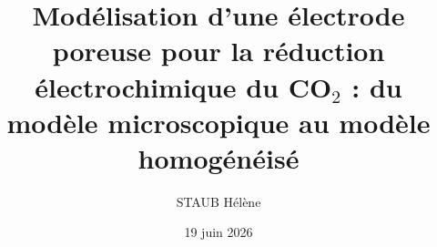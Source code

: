 \documentclass[12pt,a4paper,titlepage]{article}
\title{Modélisation d'une électrode poreuse pour la réduction électrochimique du CO$_2$ : du modèle microscopique au modèle homogénéisé}
\author{STAUB Hélène}
\date{19 juin 2026}
\begin{document}
\maketitle
\renewcommand{\nomname}{Nomenclature}
\printnomenclature           %
\newpage

\newpage

\newpage %

\newpage

\newpage

\newpage

\newpage

\newpage

\newpage

%
\newpage




\newpage



\newpage
\appendix

\newpage

\newpage

\end{document}
